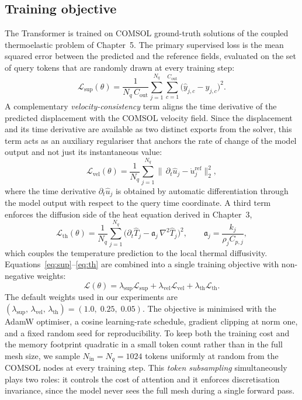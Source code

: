 \subsection{Training objective}

The Transformer is trained on COMSOL ground-truth solutions of the
coupled thermoelastic problem of Chapter~5. The primary supervised
loss is the mean squared error between the predicted and the reference
fields, evaluated on the set of query tokens that are randomly drawn
at every training step:
\begin{equation}
\mathcal{L}_{\mathrm{sup}}(\theta) =
\frac{1}{N_q\,C_{\mathrm{out}}}
\sum_{j=1}^{N_q}\sum_{c=1}^{C_{\mathrm{out}}}
\big(\hat{y}_{j,c} - y_{j,c}\big)^2.
\label{eq:sup}
\end{equation}
A complementary \emph{velocity-consistency} term aligns the time
derivative of the predicted displacement with the COMSOL velocity
field. Since the displacement and its time derivative are available as
two distinct exports from the solver, this term acts as an auxiliary
regulariser that anchors the rate of change of the model output and
not just its instantaneous value:
\begin{equation}
\mathcal{L}_{\mathrm{vel}}(\theta) =
\frac{1}{N_q}\sum_{j=1}^{N_q}
\big\|\,\partial_t \hat{u}_j - \dot{u}_j^{\mathrm{ref}}\big\|_2^2,
\label{eq:vel}
\end{equation}
where the time derivative \(\partial_t\hat{u}_j\) is obtained
by automatic differentiation through the model output with respect to
the query time coordinate. A third term enforces the diffusion side of
the heat equation derived in Chapter~3,
\begin{equation}
\mathcal{L}_{\mathrm{th}}(\theta) =
\frac{1}{N_q}\sum_{j=1}^{N_q}
\bigg(
  \partial_t \hat T_j
  - \mathfrak{a}_j\,\nabla^2 \hat T_j
\bigg)^{\!2},
\qquad
\mathfrak{a}_j = \frac{k_j}{\rho_j C_{p,j}},
\label{eq:th}
\end{equation}
which couples the temperature prediction to the local thermal
diffusivity. Equations~\eqref{eq:sup}--\eqref{eq:th} are combined into
a single training objective with non-negative weights:
\begin{equation}
\mathcal{L}(\theta) =
\lambda_{\mathrm{sup}}\mathcal{L}_{\mathrm{sup}}
+ \lambda_{\mathrm{vel}}\mathcal{L}_{\mathrm{vel}}
+ \lambda_{\mathrm{th}}\mathcal{L}_{\mathrm{th}}.
\end{equation}
The default weights used in our experiments are
\((\lambda_{\mathrm{sup}},\,\lambda_{\mathrm{vel}},\,\lambda_{\mathrm{th}}) = (1.0,\;0.25,\;0.05)\).
The objective is minimised with the AdamW optimiser, a cosine
learning-rate schedule, gradient clipping at norm one, and a fixed
random seed for reproducibility. To keep both the training cost and
the memory footprint quadratic in a small token count rather than in
the full mesh size, we sample \(N_{\mathrm{in}} = N_q = 1024\) tokens
uniformly at random from the COMSOL nodes at every training step. This
\emph{token subsampling} simultaneously plays two roles: it controls
the cost of attention and it enforces discretisation invariance, since
the model never sees the full mesh during a single forward pass.

